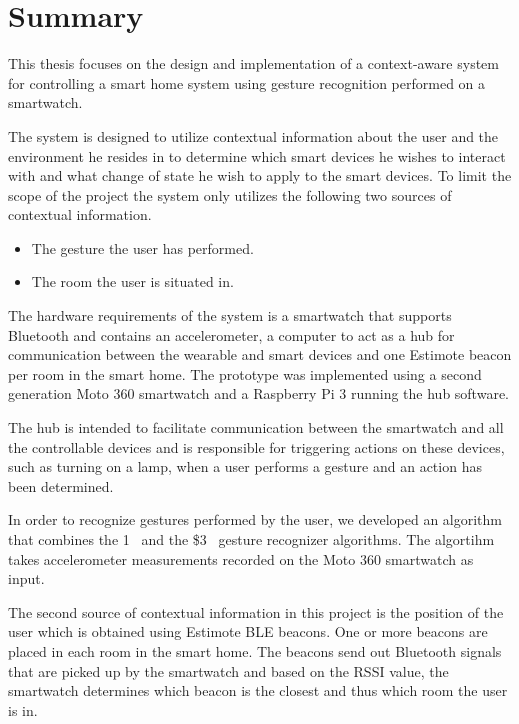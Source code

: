 \section*{Summary}
\label{formalities:summary}

This thesis focuses on the design and implementation of a context-aware system for controlling a smart home system using gesture recognition performed on a smartwatch.

The system is designed to utilize contextual information about the user and the environment he resides in to determine which smart devices he wishes to interact with and what change of state he wish to apply to the smart devices.
To limit the scope of the project the system only utilizes the following two sources of contextual information. 

\begin{itemize}
\item The gesture the user has performed.
\item The room the user is situated in.
\end{itemize}

The hardware requirements of the system is a smartwatch that supports Bluetooth and contains an accelerometer, a computer to act as a hub for communication between the wearable and smart devices and one Estimote beacon per room in the smart home.
The prototype was implemented using a second generation Moto 360 smartwatch and a Raspberry Pi 3 running the hub software.

The hub is intended to facilitate communication between the smartwatch and all the controllable devices and is responsible for triggering actions on these devices, such as turning on a lamp, when a user performs a gesture and an action has been determined.

In order to recognize gestures performed by the user, we developed an algorithm that combines the 1\textcent~\cite{herold20121} and the \$3~\cite{threedollar} gesture recognizer algorithms. The algortihm takes accelerometer measurements recorded on the Moto 360 smartwatch as input.

The second source of contextual information in this project is the position of the user which is obtained using Estimote BLE beacons. One or more beacons are placed in each room in the smart home.
The beacons send out Bluetooth signals that are picked up by the smartwatch and based on the RSSI value, the smartwatch determines which beacon is the closest and thus which room the user is in.

